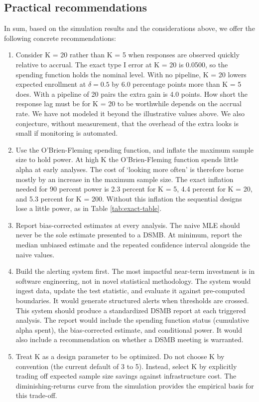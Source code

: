 \documentclass[
  11pt,
]{article}
\begin{document}
\subsection{Practical recommendations}\label{practical-recommendations}

In sum, based on the simulation results and the
considerations above, we offer the following concrete
recommendations:

\begin{enumerate}
\def\labelenumi{\arabic{enumi}.}
\item
  Consider K = 20 rather than K = 5 when responses
  are observed quickly relative to accrual. The exact
  type I error at K = 20 is
  0.0500, so the
  spending function holds the nominal level. With no
  pipeline, K = 20 lowers expected enrollment at
  \(\delta = 0.5\) by
  6.0
  percentage points more than K = 5 does. With a
  pipeline of 20 pairs the extra gain is
  4.0
  points. How short the response lag must be for K =
  20 to be worthwhile depends on the accrual rate. We
  have not modeled it beyond the illustrative values
  above. We also conjecture, without measurement, that
  the overhead of the extra looks is small if
  monitoring is automated.
\item
  Use the O'Brien-Fleming spending function, and
  inflate the maximum sample size to hold power. At
  high K the O'Brien-Fleming function spends little
  alpha at early analyses. The cost of `looking more
  often' is therefore borne mostly by an increase in
  the maximum sample size. The exact inflation needed
  for 90 percent power is
  2.3 percent
  for K = 5,
  4.4 percent
  for K = 20, and
  5.3 percent
  for K = 200. Without this inflation the sequential
  designs lose a little power, as in Table
  \ref{tab:exact-table}.
\item
  Report bias-corrected estimates at every analysis.
  The naive MLE should never be the sole estimate
  presented to a DSMB. At minimum, report the median
  unbiased estimate and the repeated confidence
  interval alongside the naive values.
\item
  Build the alerting system first. The most impactful
  near-term investment is in software engineering,
  not in novel statistical methodology. The system
  would ingest data, update the test statistic, and
  evaluate it against pre-computed boundaries. It
  would generate structured alerts when thresholds
  are crossed. This system should produce a
  standardized DSMB report at each triggered
  analysis. The report would include the spending
  function status (cumulative alpha spent), the
  bias-corrected estimate, and conditional power. It
  would also include a recommendation on whether a
  DSMB meeting is warranted.
\item
  Treat K as a design parameter to be optimized. Do
  not choose K by convention (the current default of
  3 to 5). Instead, select K by explicitly trading
  off expected sample size savings against
  infrastructure cost. The diminishing-returns curve
  from the simulation provides the empirical basis
  for this trade-off.
\end{enumerate}
\end{document}
